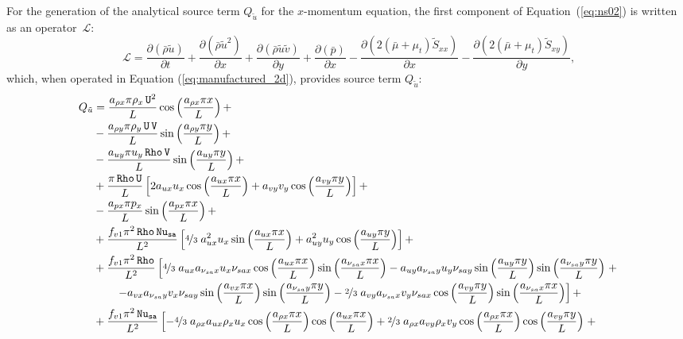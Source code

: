 \documentclass[10pt]{article}
\newcommand{\Diff}[2] {\dfrac{\partial( #1)}{\partial #2}}
\newcommand{\Rho}{\,\mathtt{Rho}}
\newcommand{\U}{\,\mathtt{U}}
\newcommand{\V}{\,\mathtt{V}}
\newcommand{\Nu}{\,\mathtt{Nu_{sa}}}
\newcommand{\Lo}{\,\mathcal{L}}
\newcommand{\brho}{\bar{\rho}}
\newcommand{\bp}{\bar{p}}
\newcommand{\tu}{\tilde{u}}
\newcommand{\tv}{\tilde{v}}
\newcommand{\tS}{\tilde{S}}
\newcommand{\bmu}{\bar{\mu}}
\begin{document}
For the generation of the analytical source term $Q_{\tu}$ for the $x$-momentum equation, the first component of Equation~(\ref{eq:ns02}) is written as an  operator $\Lo$:
\begin{equation*}
 \Lo= \Diff{\brho \tu}{t} +\Diff{\brho \tu^2 }{x}+\Diff{\brho \tu\tv}{y} +\Diff{\bp}{x}-\Diff{2(\bmu+\mu_t)\tS_{xx}}{x}-\Diff{2(\bmu+\mu_t)\tS_{xy}}{y},
\end{equation*}
which, when operated in Equation (\ref{eq:manufactured_2d}), provides source term $Q_{\tu}$:
\begin{equation}
 \begin{split}
 Q_{\tu} &= \dfrac{a_{\rho x} \pi \rho_x \U^2 }{L} \cos\left(\dfrac{a_{\rho x} \pi x}{L}\right)+ \\
&-\dfrac{a_{\rho y} \pi \rho_y \U \V  }{L}\sin\left(\dfrac{a_{\rho y} \pi y}{L}\right)+ \\
&-\dfrac{a_{uy} \pi u_y \Rho \V  }{L}\sin\left(\dfrac{a_{uy} \pi y}{L}\right)+ \\
&+ \dfrac{\pi \Rho \U}{L}\left[2 a_{ux} u_x  \cos\left(\dfrac{a_{ux} \pi x}{L}\right)+a_{vy} v_y  \cos\left(\dfrac{a_{vy} \pi y}{L}\right)\right]+ \\
&-\dfrac{a_{px} \pi p_x  }{L}\sin\left(\dfrac{a_{px} \pi x}{L}\right)+ \\
&+\dfrac{f_{v1} \pi^2 \Rho \Nu}{L^2}\left[\nicefrac{4}{3} \; a_{ux}^2 u_x  \sin\left(\dfrac{a_{ux} \pi x}{L}\right)+a_{uy}^2 u_y  \cos\left(\dfrac{a_{uy} \pi y}{L}\right)\right] + \\
&+\dfrac{f_{v1} \pi^2 \Rho}{L^2}\left[\nicefrac{4}{3} \; a_{ux} a_{\nu_{sa} x} u_x \nu_{sa x}  \cos\left(\dfrac{a_{ux} \pi x}{L}\right)  \sin\left(\dfrac{a_{\nu_{sa} x} \pi x}{L}\right)- a_{uy} a_{\nu_{sa} y} u_y \nu_{sa y} \sin\left(\dfrac{a_{uy} \pi y}{L}\right)  \sin\left(\dfrac{a_{\nu_{sa} y} \pi y}{L}\right)\right.+\\
    &\qquad\left.- a_{vx} a_{\nu_{sa} y} v_x \nu_{sa y} \sin\left(\dfrac{a_{vx} \pi x}{L}\right)  \sin\left(\dfrac{a_{\nu_{sa} y} \pi y}{L}\right)-\nicefrac{2}{3} \;  a_{vy} a_{\nu_{sa} x} v_y \nu_{sa x} \cos\left(\dfrac{a_{vy} \pi y}{L}\right)  \sin\left(\dfrac{a_{\nu_{sa} x} \pi x}{L}\right)\right] + \\
&+\dfrac{f_{v1} \pi^2 \Nu}{L^2}\left[-\nicefrac{4}{3} \; a_{\rho x} a_{ux} \rho_x u_x  \cos\left(\dfrac{a_{\rho x} \pi x}{L}\right)  \cos\left(\dfrac{a_{ux} \pi x}{L}\right)+\nicefrac{2}{3} \; a_{\rho x} a_{vy} \rho_x v_y  \cos\left(\dfrac{a_{\rho x} \pi x}{L}\right)  \cos\left(\dfrac{a_{vy} \pi y}{L}\right)\right.+\\

\end{split}
\end{equation}
\end{document}
